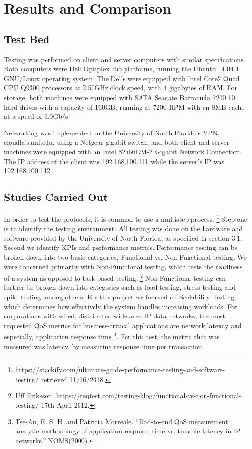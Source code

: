 \section{Results and Comparison}

\subsection{Test Bed}

Testing was performed on client and server computers with similar specifications. 
Both computers were Dell Optiplex 755 platforms, running the Ubuntu 14.04.4 GNU/Linux operating system. 
The Dells were equipped with Intel Core2 Quad CPU Q9300 processors at 2.50GHz clock speed, with 4 gigabytes of RAM. 
For storage, both machines were equipped with SATA Seagate Barracuda 7200.10 hard drives with a capacity of 160GB, running at 7200 RPM with an 8MB cache at a speed of 3.0Gb/s.

Networking was implemented on the University of North Florida’s VPN, cloudlab.unf.edu, using a Netgear gigabit switch, and both client and server machines were equipped with an Intel 82566DM-2 Gigabit Network Connection. 
The IP address of the client was 192.168.100.111 while the server’s IP was 192.168.100.112.

\subsection{Studies Carried Out}

In order to test the protocols, it is common to use a multistep process.
\footnote{
	https://stackify.com/ultimate-guide-performance-testing-and-software-testing/ 
	retrieved 11/16/2018.
}
Step one is to identify the testing environment. 
All testing was done on the hardware and software provided by the University of North Florida, as specified in section 3.1. 
Second we identify KPIs and performance metrics. 
Performance testing can be broken down into two basic categories, Functional vs. Non Functional testing. 
We were concerned primarily with Non-Functional testing, which tests the readiness of a system as opposed to task-based testing.
\footnote{
	Uff Eriksson. https://reqtest.com/testing-blog/functional-vs-non-functional-testing/
	17th April 2012.
} 
Non-Functional testing can further be broken down into categories such as load testing, stress testing and spike testing among others. 
For this project we focused on Scalability Testing, which determines how effectively the system handles increasing workloads. 
For corporations with wired, distributed wide area IP data networks, the most requested QoS metrics for business-critical applications are network latency and especially, application response time
\footnote{
	Tse-Au, E. S. H. and Patricia Morreale. ``End-to-end QoS measurement: analytic methodology of application response time vs. tunable latency in IP networks.'' NOMS(2000).
}.
For this test, the metric that was measured was latency, by measuring response time per transaction.

